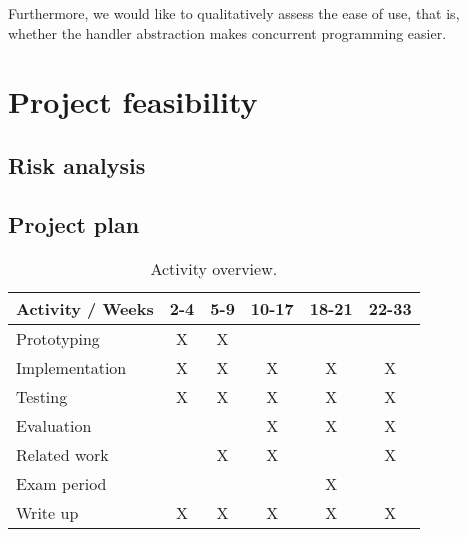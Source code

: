 \documentclass[preprint,10pt,numbers]{sigplanconf}
\begin{document}
Furthermore, we would like to qualitatively assess the ease of use, that is, whether the handler abstraction makes concurrent programming easier.

  \section{Project feasibility}
  \subsection{Risk analysis}

  \subsection{Project plan}
  \begin{table}[H]
    \centering
    \begin{tabular}{ | l | c | c | c | c | c | }
      \hline
      \multicolumn{1}{|c|}{Activity / Weeks} & 2-4 & 5-9 & 10-17 & 18-21 & 22-33 \\
      \hline
      Prototyping    & X & X & & & \\
      \hline
      Implementation & X & X & X & X & X \\
      \hline
      Testing        & X & X & X & X & X \\
      \hline
      Evaluation     &   &   & X & X & X \\
      \hline
      Related work   &   & X & X &   & X \\
      \hline
      Exam period    &   &   &   & X &   \\
      \hline
      Write up       & X & X & X & X & X  \\
      \hline
    \end{tabular}\caption{Activity overview.}
  \end{table}

\softraggedright
\nocite{*}

\end{document}
